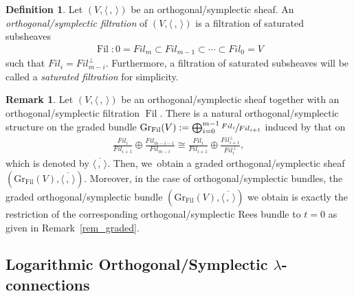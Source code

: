 \documentclass[11pt]{article}
\newcommand{\Subsection}{\subsection}
\numberwithin{equation}{section}
\newcommand{\Fil}{\textit{Fil}}
\DeclareMathOperator{\Filt}{Fil}
\newcommand{\Gr}{\mathrm{Gr}}
\theoremstyle{plain}
\theoremstyle{definition}
\newtheorem{defn}[thm]{Definition}
\newtheorem{rem}[thm]{Remark}
\begin{document}
\begin{defn}
Let $(V,\langle \,, \, \rangle)$ be an orthogonal/symplectic sheaf. An \emph{orthogonal/symplectic filtration} of $(V,\langle \,, \, \rangle)$ is a filtration of saturated subsheaves
\begin{align*}
\Filt: 0=\Fil_m \subset \Fil_{m-1} \subset \cdots \subset \Fil_0=V
\end{align*}
such that $\Fil_{i}= \Fil_{m-i}^\perp$. Furthermore, a filtration of saturated subsheaves will be called a \emph{saturated filtration} for simplicity.
\end{defn}

\begin{rem}
Let $(V, \langle \,, \, \rangle)$ be an orthogonal/symplectic sheaf together with an orthogonal/symplectic filtration $\Filt$. There is a natural orthogonal/symplectic structure on the graded bundle
$\Gr_{\Filt}(V):=\mathop{\bigoplus}_{i=0}^{m-1}\sfrac{\Fil_i} {\Fil_{i+1}}$ induced by that on
\begin{align*}
\frac{\Fil_i}{\Fil_{i+1}} \oplus \frac{\Fil_{m-i-1}}{\Fil_{m-i}} \cong \frac{\Fil_{i}}{\Fil_{i+1}} \oplus \frac{\Fil^\perp_{i+1}}{\Fil^\perp_{i}},
\end{align*}
which is denoted by $\overline{\langle \,, \, \rangle}$. Then, we~obtain a graded orthogonal/symplectic sheaf $(\Gr_{\Filt}(V), \overline{\langle \,, \, \rangle})$. Moreover, in the case of orthogonal/symplectic bundles, the graded orthogonal/symplectic bundle $(\Gr_{\Filt}(V), \overline{\langle \,, \, \rangle})$ we obtain is exactly the restriction of the corresponding orthogonal/symplectic Rees bundle to $t=0$ as given in Remark~\ref{rem_graded}.
\end{rem}

\Subsection{Logarithmic Orthogonal/Symplectic $\lambda$-connections}\label{subsect_log_lambda_conn}
\end{document}
